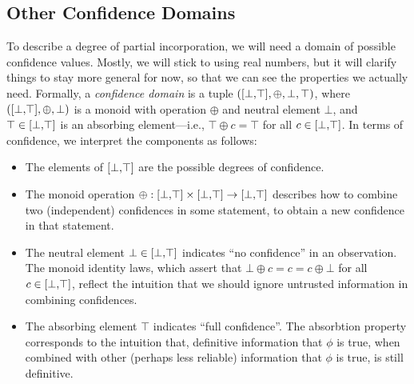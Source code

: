 \begin{subappendices}
    \section{Other Confidence Domains}

    To describe a degree of partial incorporation, we will need a domain of possible confidence values.
    Mostly, we will stick to using real numbers, but it will clarify things to stay more general for now, so that we can see the properties we actually need.
    Formally, a \emph{confidence domain} is a tuple $([\bot,\!\top], \oplus, \bot, \top)$,
    where $([\bot,\!\top], \oplus, \bot)$ is a monoid with operation $\oplus$ and neutral element $\bot$, and $\top \in [\bot,\!\top]$ is an absorbing element---i.e., $\top \oplus c = \top$ for all $c \in [\bot,\!\top]$.
    In terms of confidence, we interpret the components as follows:

    \begin{itemize}%
    	\item
    	The elements of $[\bot,\!\top]$ are the possible degrees of confidence.

    	\item
    	The monoid operation $\oplus : [\bot,\!\top] \times [\bot,\!\top] \to [\bot,\!\top]$ describes how to combine two (independent) confidences in some statement, to obtain a new confidence in that statement.

    	\item The neutral element $\bot \in [\bot,\!\top]$ indicates ``no confidence'' in an observation.
    	The monoid identity laws, which assert that
    		$\bot \oplus c = c = c \oplus \bot$ for all $c \in [\bot,\!\top]$,
    	reflect the intuition that we should ignore untrusted information in combining confidences.
    	\item The absorbing element $\top$ indicates ``full confidence''.
    	The absorbtion property corresponds to the intuition that, definitive information that $\phi$ is true, when combined with other (perhaps less reliable) information that $\phi$ is true, is still definitive.
    \end{itemize}


\end{subappendices}
